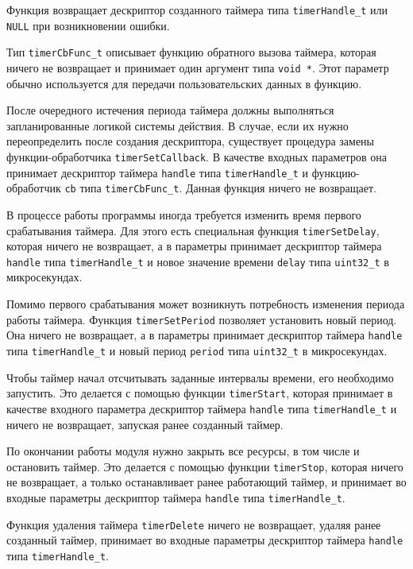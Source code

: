 Функция возвращает дескриптор созданного таймера типа \lstinline{timerHandle_t} или \lstinline{NULL} при возникновении ошибки.

Тип \lstinline{timerCbFunc_t} описывает функцию обратного вызова таймера, которая
ничего не возвращает и принимает один аргумент типа \lstinline{void *}. Этот
параметр обычно используется для передачи пользовательских данных в
функцию.

После очередного истечения периода таймера должны выполняться запланированные логикой системы действия. В случае, если их нужно переопределить после создания дескриптора, существует процедура замены функции-обработчика
\lstinline{timerSetCallback}. В качестве входных параметров она принимает дескриптор таймера \lstinline{handle} типа \lstinline{timerHandle_t} и функцию-обработчик
\lstinline{cb} типа \lstinline{timerCbFunc_t}. Данная функция ничего не возвращает.

В процессе работы программы иногда требуется изменить время первого срабатывания таймера. Для этого есть специальная функция \lstinline{timerSetDelay}, которая ничего не возвращает,
а в параметры принимает дескриптор таймера \lstinline{handle} типа \lstinline{timerHandle_t} и новое значение времени \lstinline{delay} типа \lstinline{uint32_t} в микросекундах.

Помимо первого срабатывания может возникнуть потребность изменения периода работы таймера. Функция \lstinline{timerSetPeriod} позволяет установить новый период. Она ничего не возвращает,
а в параметры принимает дескриптор таймера \lstinline{handle} типа \lstinline{timerHandle_t} и новый период \lstinline{period} типа \lstinline{uint32_t} в микросекундах.

Чтобы таймер начал отсчитывать заданные интервалы времени, его необходимо запустить. Это делается с помощью функции \lstinline{timerStart}, которая принимает в качестве входного параметра
дескриптор таймера \lstinline{handle} типа \lstinline{timerHandle_t} и ничего не возвращает, запуская ранее созданный таймер.

По окончании работы модуля нужно закрыть все ресурсы, в том числе и остановить таймер. Это делается с помощью функции \lstinline{timerStop}, которая ничего не возвращает,
а только останавливает ранее работающий таймер, и принимает во входные параметры дескриптор таймера \lstinline{handle} типа \lstinline{timerHandle_t}.

Функция удаления таймера \lstinline{timerDelete} ничего не возвращает, удаляя ранее созданный таймер, принимает во входные параметры дескриптор таймера \lstinline{handle} типа \lstinline{timerHandle_t}.

